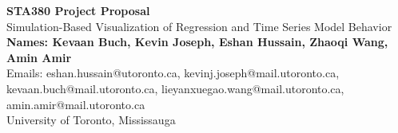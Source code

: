 \documentclass{article}
\begin{document}
	\begin{center}
    
    
		\LARGE{\textbf{STA380 Project Proposal}} \\
        \vspace{1em}
        \Large{Simulation-Based Visualization of Regression and Time Series Model Behavior} \\
        \vspace{1em}
        \normalsize\textbf{Names: Kevaan Buch, Kevin Joseph, Eshan Hussain, Zhaoqi Wang, Amin Amir} \\
        \normalsize{Emails: eshan.hussain@utoronto.ca, kevinj.joseph@mail.utoronto.ca, kevaan.buch@mail.utoronto.ca, lieyanxuegao.wang@mail.utoronto.ca, amin.amir@mail.utoronto.ca} \\
        \vspace{1em}
        \normalsize{University of Toronto, Mississauga}
     
	\end{center}
\end{document}

